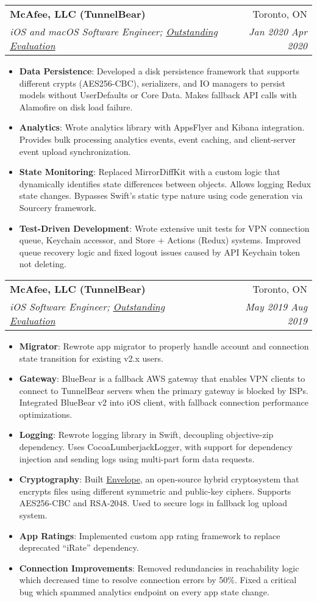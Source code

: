 \documentclass{article}
\makeatletter
\newcommand{\resumeItem}[2]{
  \item\small{
    \textbf{#1}{: #2\vspace{-2pt}}
  }
}
\newcommand{\resumeSubheading}[4]{
  \vspace{-1pt}\item
    \begin{tabular*}{0.97\textwidth}[t]{l@{\extracolsep{\fill}}r}
      \textbf{#1}&#2 \\
      \textit{\small#3}&\textit{\small#4} \\
    \end{tabular*}
}
\newcommand{\resumeItemListStart}{\vspace{-4pt}\begin{itemize}}
\newcommand{\resumeItemListEnd}{\end{itemize}\vspace{-4pt}}
\makeatother
\begin{document}
    \resumeSubheading{McAfee, LLC (TunnelBear)}{Toronto, ON}{iOS and macOS Software Engineer; \href{https://george-lim.github.io/evaluations/evaluation-3b.pdf}{Outstanding Evaluation}}{Jan 2020 \textendash{} Apr 2020}
      \resumeItemListStart{}
        \resumeItem{Data Persistence}
          {Developed a disk persistence framework that supports different crypts (AES256-CBC), serializers, and IO managers to persist models without UserDefaults or Core Data. Makes fallback API calls with Alamofire on disk load failure.}
        \resumeItem{Analytics}
          {Wrote analytics library with AppsFlyer and Kibana integration. Provides bulk processing analytics events, event caching, and client-server event upload synchronization.}
        \resumeItem{State Monitoring}
          {Replaced MirrorDiffKit with a custom logic that dynamically identifies state differences between objects. Allows logging Redux state changes. Bypasses Swift's static type nature using code generation via Sourcery framework.}
        \resumeItem{Test-Driven Development}
          {Wrote extensive unit tests for VPN connection queue, Keychain accessor, and Store + Actions (Redux) systems. Improved queue recovery logic and fixed logout issues caused by API Keychain token not deleting.}
      \resumeItemListEnd{}

    \resumeSubheading{McAfee, LLC (TunnelBear)}{Toronto, ON}{iOS Software Engineer; \href{https://george-lim.github.io/evaluations/evaluation-3a.pdf}{Outstanding Evaluation}}{May 2019 \textendash{} Aug 2019}
      \resumeItemListStart{}
        \resumeItem{Migrator}
          {Rewrote app migrator to properly handle account and connection state transition for existing v2.x users.}
        \resumeItem{Gateway}
          {BlueBear is a fallback AWS gateway that enables VPN clients to connect to TunnelBear servers when the primary gateway is blocked by ISPs. Integrated BlueBear v2 into iOS client, with fallback connection performance optimizations.}
        \resumeItem{Logging}
          {Rewrote logging library in Swift, decoupling objective-zip dependency. Uses CocoaLumberjackLogger, with support for dependency injection and sending logs using multi-part form data requests.}
        \resumeItem{Cryptography}
          {Built \href{https://github.com/george-lim/envelope}{Envelope}, an open-source hybrid cryptosystem that encrypts files using different symmetric and public-key ciphers. Supports AES256-CBC and RSA-2048. Used to secure logs in fallback log upload system.}
        \resumeItem{App Ratings}
          {Implemented custom app rating framework to replace deprecated ``iRate'' dependency.}
        \resumeItem{Connection Improvements}
          {Removed redundancies in reachability logic which decreased time to resolve connection errors by 50\%. Fixed a critical bug which spammed analytics endpoint on every app state change.}
      \resumeItemListEnd{}
\end{document}
